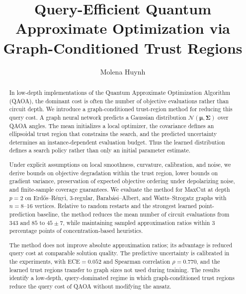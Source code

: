 \documentclass[aps,prx,reprint,superscriptaddress,longbibliography]{revtex4-2}
\newcommand{\QAOA}{\textnormal{\textsc{QAOA}}}
\newcommand{\Normal}{\mathcal{N}}
\begin{document}

\sloppy

\title{Query-Efficient Quantum Approximate Optimization via Graph-Conditioned Trust Regions}

\author{Molena Huynh}

\date{}

\begin{abstract}
In low-depth implementations of the Quantum Approximate Optimization
Algorithm (\QAOA), the dominant cost is often the number of objective
evaluations rather than circuit depth. We introduce a graph-conditioned
trust-region method for reducing this query cost. A graph neural
network predicts a Gaussian distribution $\Normal(\bm\mu,\bm\Sigma)$ over
\QAOA{} angles. The mean initializes a local optimizer, the covariance
defines an ellipsoidal trust region that constrains the search, and the
predicted uncertainty determines an instance-dependent evaluation
budget. Thus the learned distribution defines a search policy rather
than only an initial parameter estimate.

Under explicit assumptions on local smoothness, curvature, calibration,
and noise, we derive bounds on objective degradation within the trust
region, lower bounds on gradient variance, preservation of expected
objective ordering under depolarizing noise, and finite-sample coverage
guarantees. We evaluate the method for MaxCut at depth $p=2$ on
Erd\H{o}s--R\'enyi, 3-regular, Barab\'asi--Albert, and
Watts--Strogatz graphs with $n=8$--$16$ vertices. Relative to random
restarts and the strongest learned point-prediction baseline, the
method reduces the mean number of circuit evaluations from $343$ and
$85$ to $45\pm 7$, while maintaining sampled approximation ratios
within 3 percentage points of concentration-based heuristics.

The method does not improve absolute approximation ratios; its
advantage is reduced query cost at comparable solution quality. The
predictive uncertainty is calibrated in the experiments, with
ECE$=0.052$ and Spearman correlation $\rho=0.770$, and the learned
trust regions transfer to graph sizes not used during training. The
results identify a low-depth, query-dominated regime in which
graph-conditioned trust regions reduce the query cost of \QAOA{}
without modifying the ansatz.
\end{abstract}
\end{document}
